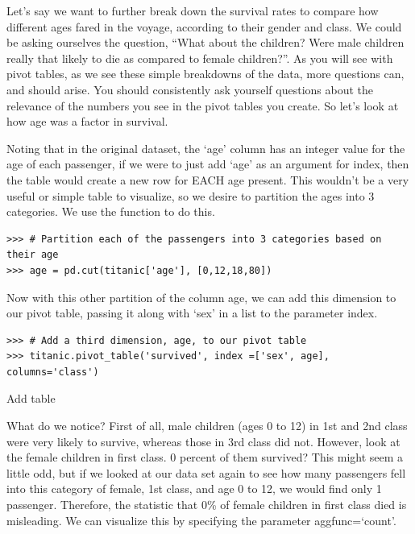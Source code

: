 Let's say we want to further break down the survival rates to compare how different ages fared in the voyage, according to their gender and class. We could be asking ourselves the question, ``What about the children? Were male children really that likely to die as compared to female children?''. As you will see with pivot tables, as we see these simple breakdowns of the data, more questions can, and should arise. You should consistently ask yourself questions about the relevance of the numbers you see in the pivot tables you create. So let's look at how age was a factor in survival.

Noting that in the original dataset, the `age' column has an integer value for the age of each passenger, if we were to just add `age' as an argument for index, then the table would create a new row for EACH age present. This wouldn't be a very useful or simple table to visualize, so we desire to partition the ages into 3 categories. We use the function  to do this.

\begin{lstlisting}
>>> # Partition each of the passengers into 3 categories based on their age
>>> age = pd.cut(titanic['age'], [0,12,18,80])
\end{lstlisting}

Now with this other partition of the column age, we can add this dimension to our pivot table, passing it along with `sex' in a list to the parameter index.

\begin{lstlisting}
>>> # Add a third dimension, age, to our pivot table
>>> titanic.pivot_table('survived', index =['sex', age], columns='class')
\end{lstlisting}

Add table

What do we notice? First of all, male children (ages 0 to 12) in 1st and 2nd class were very likely to survive, whereas those in 3rd class did not. However, look at the female children in first class. 0 percent of them survived? This might seem a little odd, but if we looked at our data set again to see how many passengers fell into this category of female, 1st class, and age 0 to 12, we would find only 1 passenger. Therefore, the statistic that 0\% of female children in first class died is misleading. We can visualize this by specifying the parameter aggfunc=`count'.

